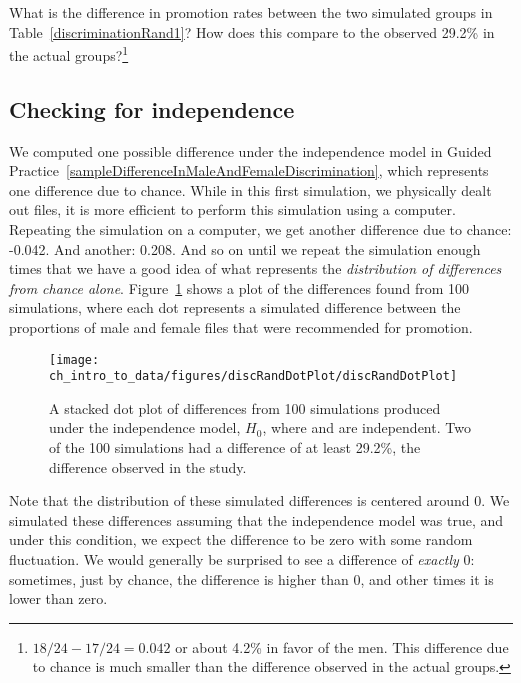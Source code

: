 \begin{exercise} \label{sampleDifferenceInMaleAndFemaleDiscrimination}
What is the difference in promotion rates between the two simulated groups in Table~\ref{discriminationRand1}? How does this compare to the observed 29.2\% in the actual groups?\footnote{$18/24 - 17/24=0.042$ or about 4.2\% in favor of the men. This difference due to chance is much smaller than the difference observed in the actual groups.}
\end{exercise}


\textC{\pagebreak}

\subsection{Checking for independence}

We computed one possible difference under the independence model in Guided Practice~\ref{sampleDifferenceInMaleAndFemaleDiscrimination}, which represents one difference due to chance. While in this first simulation, we physically dealt out files, it is more efficient to perform this simulation using a computer. Repeating the simulation on a computer, we get another difference due to chance: -0.042. And another: 0.208. And so on until we repeat the simulation enough times that we have a good idea of what represents the \emph{distribution of differences from chance alone}. Figure~\ref{discRandDotPlot} shows a plot of the differences found from 100 simulations, where each dot represents a simulated difference between the proportions of male and female files that were recommended for promotion.

\begin{figure}[ht]
\centering
\texttt{[image: ch\_intro\_to\_data/figures/discRandDotPlot/discRandDotPlot]}
\caption{A stacked dot plot of differences from 100 simulations produced under the independence model, $H_0$, where  and  are independent. Two of the 100 simulations had a difference of at least 29.2\%, the difference observed in the study.}
\label{discRandDotPlot}
\end{figure}

Note that the distribution of these simulated differences is centered around 0. We simulated these differences assuming that the independence model was true, and under this condition, we expect the difference to be zero with some random fluctuation. We would generally be surprised to see a difference of \emph{exactly} 0: sometimes, just by chance, the difference is higher than 0, and other times it is lower than zero.

